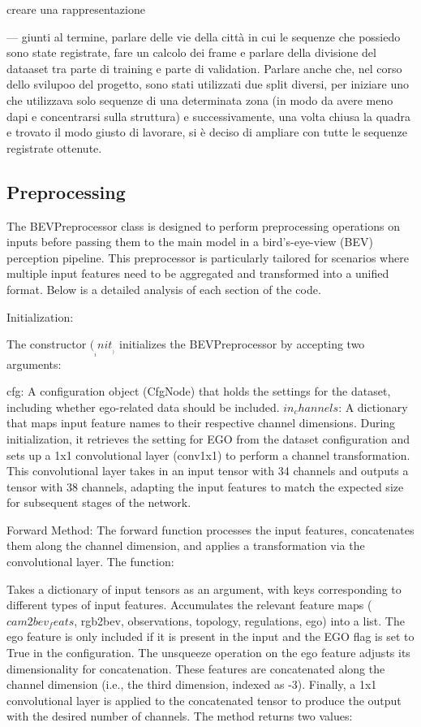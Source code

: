 creare una rappresentazione 


---
giunti al termine, parlare delle vie della città in cui le sequenze che possiedo sono state registrate, fare un calcolo dei frame e parlare della divisione del dataaset tra parte di training e parte di validation. Parlare anche che, nel corso dello svilupoo del progetto, sono stati utilizzati due split diversi, per iniziare uno che utilizzava solo sequenze di una determinata zona (in modo da avere meno dapi e concentrarsi sulla struttura) e successivamente, una volta chiusa la quadra e trovato il modo giusto di lavorare, si è deciso di ampliare con tutte le sequenze registrate ottenute. 








\subsection{Preprocessing}
The BEVPreprocessor class is designed to perform preprocessing operations on inputs before passing them to the main model in a bird's-eye-view (BEV) perception pipeline. This preprocessor is particularly tailored for scenarios where multiple input features need to be aggregated and transformed into a unified format. Below is a detailed analysis of each section of the code.

Initialization:

The constructor $(__init__)$ initializes the BEVPreprocessor by accepting two arguments:

cfg: A configuration object (CfgNode) that holds the settings for the dataset, including whether ego-related data should be included.
$in_channels$: A dictionary that maps input feature names to their respective channel dimensions.
During initialization, it retrieves the setting for EGO from the dataset configuration and sets up a 1x1 convolutional layer (conv1x1) to perform a channel transformation. This convolutional layer takes in an input tensor with 34 channels and outputs a tensor with 38 channels, adapting the input features to match the expected size for subsequent stages of the network.

Forward Method:
The forward function processes the input features, concatenates them along the channel dimension, and applies a transformation via the convolutional layer. The function:

Takes a dictionary of input tensors as an argument, with keys corresponding to different types of input features.
Accumulates the relevant feature maps ($cam2bev_feats$, rgb2bev, observations, topology, regulations, ego) into a list.
The ego feature is only included if it is present in the input and the EGO flag is set to True in the configuration. The unsqueeze operation on the ego feature adjusts its dimensionality for concatenation.
These features are concatenated along the channel dimension (i.e., the third dimension, indexed as -3).
Finally, a 1x1 convolutional layer is applied to the concatenated tensor to produce the output with the desired number of channels.
The method returns two values:

